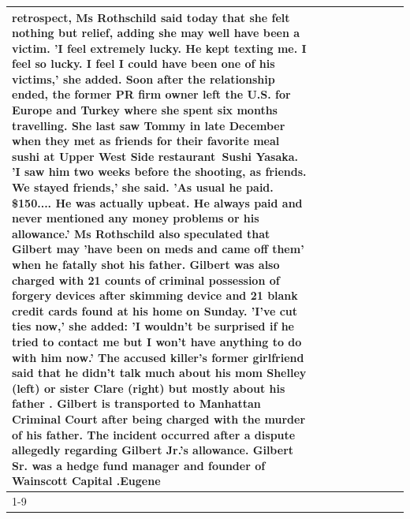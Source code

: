 \begin{table}[H]
\begin{tabular}{lllrlllll}
retrospect, Ms Rothschild said today that she felt nothing but relief, adding she may well have been a victim. 'I feel extremely lucky. He kept texting me. I feel so lucky. I feel I could have been one of his victims,' she added. Soon after the relationship ended, the former PR firm owner left the U.S. for Europe and Turkey where she spent six months  travelling. She last saw Tommy in late December when they met as friends for their favorite meal sushi at Upper West Side restaurant Sushi Yasaka. 'I saw him two weeks before the shooting, as friends. We stayed friends,' she said. 'As usual he paid. \$150.... He was actually upbeat. He always paid and never mentioned any money problems or his allowance.' Ms Rothschild also speculated that Gilbert may 'have been on meds and came off them' when he fatally shot his father. Gilbert was also charged with 21 counts of criminal possession of forgery devices after skimming device and 21 blank credit cards found at his home on Sunday. 'I've cut ties now,' she added: 'I wouldn’t be surprised if he tried to contact me but I won’t have anything to do with him now.' The accused killer's former girlfriend said that he didn't talk much about his mom Shelley (left) or sister Clare (right) but mostly about his father . Gilbert is transported to Manhattan Criminal Court  after being charged with the murder of his father. The incident occurred after a dispute allegedly regarding Gilbert Jr.'s allowance. Gilbert Sr. was a hedge fund manager and founder of Wainscott Capital .Eugene \\
\cline{1-9} \cline{2-9}

\end{tabular}
\end{table}
